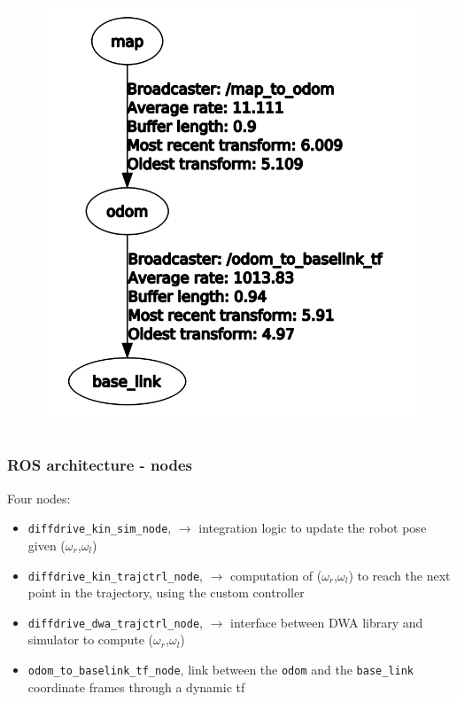 \documentclass{beamer}
\begin{document}
\begin{frame}[allowframebreaks]
\begin{columns}
\begin{figure}[H]
    \centering
    \includegraphics[scale=0.28]{img/ros_tools/rqttftree_dwa.png}
\end{figure}

\end{columns}

\end{frame}


\begin{frame}
\frametitle{ROS architecture - nodes}

Four nodes:
\begin{itemize}
  \item \texttt{diffdrive\_kin\_sim\_node}, $\rightarrow$ integration logic to update the robot pose given ($\omega_r$,$\omega_l$)
  \item \texttt{diffdrive\_kin\_trajctrl\_node}, $\rightarrow$ computation of ($\omega_r$,$\omega_l$) to reach the next point in the trajectory, using the custom controller
  \item \texttt{diffdrive\_dwa\_trajctrl\_node}, $\rightarrow$ interface between DWA library and simulator to compute ($\omega_r$,$\omega_l$)
  \item \texttt{odom\_to\_baselink\_tf\_node}, link between the \texttt{odom} and the \texttt{base\_link} coordinate frames through a dynamic tf
\end{itemize}

\end{frame}
\end{document}

